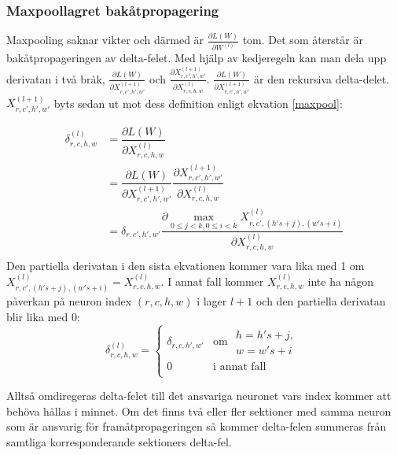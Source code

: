 \documentclass[a4paper,11pt,twoside]{article}
\newcommand*{\pd}[2]{\ensuremath{\dfrac{\partial #1}{\partial #2}}}
\newcommand*{\inpd}[2]{\ensuremath{\frac{\partial #1}{\partial #2}}}
\begin{document}
\subsubsection{Maxpoollagret bakåtpropagering}
Maxpooling saknar vikter och därmed är $\inpd{L(W)}{W^{(l)}}$ tom. Det som återstår är bakåtpropageringen av delta-felet. Med hjälp av kedjeregeln kan man dela upp derivatan i två bråk, $\inpd{L(W)}{X^{(l+1)}_{r,c',h',w'}}$ och $\inpd{X^{(l+1)}_{r,c',h',w'}}{X^{(l)}_{r,c,h,w}}$. $\inpd{L(W)}{X^{(l+1)}_{r,c',h',w'}}$ är den rekursiva delta-delet. $X^{(l+1)}_{r,c',h',w'}$ byts sedan ut mot dess definition enligt ekvation \eqref{maxpool}:

\begin{equation}
\begin{split}
	\delta^{(l)}_{r,c,h,w}
		& = \pd{L(W)}{X^{(l)}_{r,c,h,w}} \\
		& = \pd{L(W)}{X^{(l+1)}_{r,c',h',w'}} \pd{X^{(l+1)}_{r,c',h',w'}}{X^{(l)}_{r,c,h,w}} \\
		& = \delta_{r,c',h',w'} \pd{\underset{0 \leq j < k,0 \leq i < k}{\max} X^{(l)}_{r,c',(h's+j),(w's+i)}}{X^{(l)}_{r,c,h,w}} \\
\end{split}
\end{equation}
Den partiella derivatan i den sista ekvationen kommer vara lika med 1 om $X^{(l)}_{r,c',(h's+j),(w's+i)} = X^{(l)}_{r,c,h,w}$. I annat fall kommer $X^{(l)}_{r,c,h,w}$ inte ha någon påverkan på neuron index ${(r,c,h,w)}$ i lager $l+1$ och den partiella derivatan blir lika med 0:
\begin{equation}
\delta^{(l)}_{r,c,h,w} = \begin{cases}
				\delta_{r,c,h',w'} & \mbox{om } \begin{split} h = h's+j, \\w = w's+i \end{split}\\
				0 & \mbox{i annat fall}\\
			\end{cases}
\end{equation}

Alltså omdiregeras delta-felet till det ansvariga neuronet vars index kommer att behöva hållas i minnet. Om det finns två eller fler sektioner med samma neuron som är ansvarig för framåtpropageringen så kommer delta-felen summeras från samtliga korresponderande sektioners delta-fel.
\end{document}
